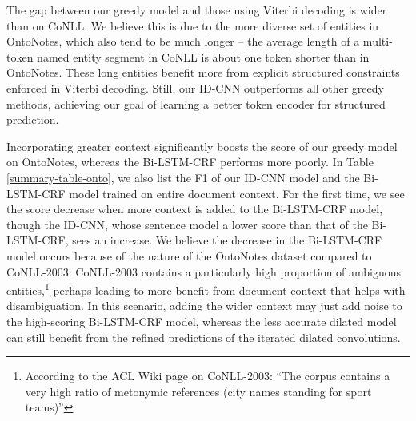 The gap between our greedy model and those using Viterbi decoding is wider than on CoNLL. We believe this is due to the more diverse set of entities in OntoNotes, which also tend to be much longer -- the average length of a multi-token named entity segment in CoNLL is about one token shorter than in OntoNotes. These long entities benefit more from explicit structured constraints enforced in Viterbi decoding. Still, our ID-CNN outperforms all other greedy methods, achieving our goal of learning a better token encoder for structured prediction.

Incorporating greater context significantly boosts the score of our greedy model on OntoNotes, whereas the Bi-LSTM-CRF performs more poorly. In Table \ref{summary-table-onto}, we also list the F1 of our ID-CNN model and the Bi-LSTM-CRF model trained on entire document context. For the first time, we see the score decrease when more context is added to the Bi-LSTM-CRF model, though the ID-CNN, whose sentence model a lower score than that of the Bi-LSTM-CRF, sees an increase. We believe the decrease in the Bi-LSTM-CRF model occurs because of the nature of the OntoNotes dataset compared to CoNLL-2003: CoNLL-2003 contains a particularly high proportion of ambiguous entities,\footnote{According to the ACL Wiki page on CoNLL-2003: ``The corpus contains a very high ratio of metonymic references (city names standing for sport teams)''} perhaps leading to more benefit from document context that helps with disambiguation. In this scenario, adding the wider context may just add noise to the high-scoring Bi-LSTM-CRF model, whereas the less accurate dilated model can still benefit from the refined predictions of the iterated dilated convolutions.